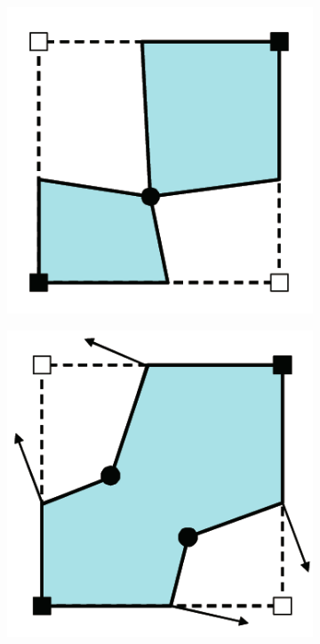 \begin{figure}
\begin{center}
\begin{subfigure}[t]{.2\textwidth}
\begin{center}
\label{sfig:ManifoldDC2}
\end{center}
\end{subfigure}
\qquad
\begin{subfigure}[t]{.2\textwidth}
\begin{center}
\includegraphics[width=\textwidth]{Pictures/SurfaceReconstruction/ManifoldDC3.png}
\label{sfig:ManifoldDC3}
\end{center}
\end{subfigure}
\qquad
\begin{subfigure}[t]{.2\textwidth}
\begin{center}
\includegraphics[width=\textwidth]{Pictures/SurfaceReconstruction/ManifoldDC4.png}

\end{center}
\end{subfigure}
\end{center}
\end{figure}
